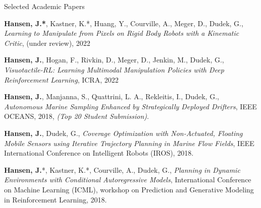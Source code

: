 \documentclass{resume} %
\begin{document}
 \begin{rSection}{Selected Academic Papers}

\textbf{Hansen, J.*}, Kastner, K.*, Huang, Y., Courville, A., Meger, D., Dudek, G., \textit{Learning to Manipulate from Pixels on Rigid Body Robots with a Kinematic Critic}, (under review), 2022

\textbf{Hansen, J.}, Hogan, F., Rivkin, D., Meger, D., Jenkin, M., Dudek, G., \textit{Visuotactile-RL: Learning Multimodal Manipulation Policies with Deep Reinforcement Learning}, ICRA, 2022


\textbf{Hansen, J.}, Manjanna, S.,  Quattrini, L. A., Rekleitis, I., Dudek, G., \textit{Autonomous Marine Sampling Enhanced by Strategically Deployed Drifters}, IEEE OCEANS, 2018, \emph{{(Top 20 Student Submission)}}.

\textbf{Hansen, J.}, Dudek, G., \textit{Coverage Optimization with Non-Actuated, Floating Mobile Sensors using Iterative Trajectory Planning in Marine Flow Fields}, IEEE International Conference on Intelligent Robots (IROS), 2018.

\textbf{Hansen, J.}*, Kastner, K.*, Courville, A., Dudek, G.,  \textit{Planning in Dynamic Environments with Conditional Autoregressive Models}, International Conference on Machine Learning (ICML), workshop on Prediction and Generative Modeling in Reinforcement Learning, 2018.


\end{rSection}
\end{document}
